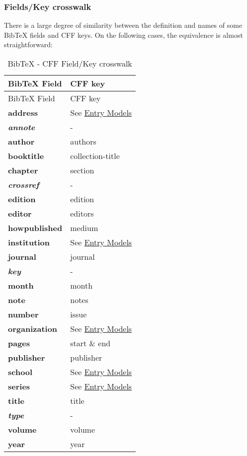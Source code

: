 \documentclass[
]{article}
\begin{document}
\hypertarget{fieldskey-crosswalk}{%
\subsubsection{Fields/Key crosswalk}\label{fieldskey-crosswalk}}

There is a large degree of similarity between the definition and names
of some BibTeX fields and CFF keys. On the following cases, the
equivalence is almost straightforward:

\begin{longtable}[]{@{}ll@{}}
\caption{BibTeX - CFF Field/Key crosswalk}\tabularnewline
\toprule
BibTeX Field & CFF key \\
\midrule
\endfirsthead
\toprule
BibTeX Field & CFF key \\
\midrule
\endhead
\textbf{address} & See \protect\hyperlink{entry-models}{Entry Models} \\
\textbf{\emph{annote}} & - \\
\textbf{author} & authors \\
\textbf{booktitle} & collection-title \\
\textbf{chapter} & section \\
\textbf{\emph{crossref}} & - \\
\textbf{edition} & edition \\
\textbf{editor} & editors \\
\textbf{howpublished} & medium \\
\textbf{institution} & See \protect\hyperlink{entry-models}{Entry
Models} \\
\textbf{journal} & journal \\
\textbf{\emph{key}} & - \\
\textbf{month} & month \\
\textbf{note} & notes \\
\textbf{number} & issue \\
\textbf{organization} & See \protect\hyperlink{entry-models}{Entry
Models} \\
\textbf{pages} & start \& end \\
\textbf{publisher} & publisher \\
\textbf{school} & See \protect\hyperlink{entry-models}{Entry Models} \\
\textbf{series} & See \protect\hyperlink{entry-models}{Entry Models} \\
\textbf{title} & title \\
\textbf{\emph{type}} & - \\
\textbf{volume} & volume \\
\textbf{year} & year \\
\bottomrule
\end{longtable}
\end{document}
